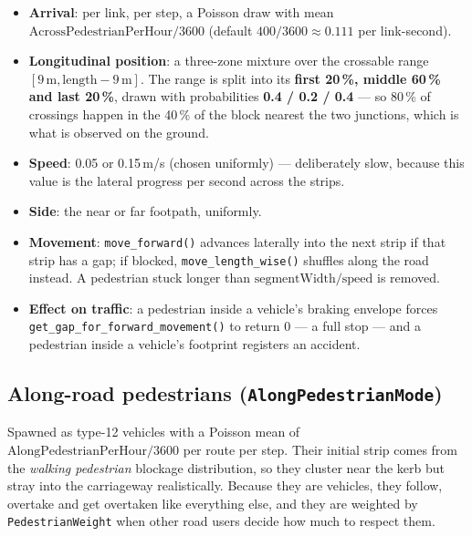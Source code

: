 \documentclass[11pt, a4paper]{article}
\newcommand{\code}[1]{\texttt{#1}}
\begin{document}
\begin{itemize}
    \item \textbf{Arrival}: per link, per step, a Poisson draw with mean
          $\text{AcrossPedestrianPerHour}/3600$ (default
          $400/3600 \approx 0.111$ per link-second).
    \item \textbf{Longitudinal position}: a three-zone mixture over the crossable
          range $[9\,\text{m}, \text{length}-9\,\text{m}]$. The range is split
          into its \textbf{first 20\,\%, middle 60\,\% and last 20\,\%}, drawn
          with probabilities \textbf{0.4 / 0.2 / 0.4} --- so 80\,\% of crossings
          happen in the 40\,\% of the block nearest the two junctions, which is
          what is observed on the ground.
    \item \textbf{Speed}: 0.05 or 0.15\,m/s (chosen uniformly) --- deliberately
          slow, because this value is the lateral progress per second across the
          strips.
    \item \textbf{Side}: the near or far footpath, uniformly.
    \item \textbf{Movement}: \code{move\_forward()} advances laterally into the
          next strip if that strip has a gap; if blocked,
          \code{move\_length\_wise()} shuffles along the road instead. A
          pedestrian stuck longer than $\text{segmentWidth}/\text{speed}$ is
          removed.
    \item \textbf{Effect on traffic}: a pedestrian inside a vehicle's braking
          envelope forces \code{get\_gap\_for\_forward\_movement()} to return 0
          --- a full stop --- and a pedestrian inside a vehicle's footprint
          registers an accident.
\end{itemize}

\subsection{Along-road pedestrians (\code{AlongPedestrianMode})}

Spawned as type-12 vehicles with a Poisson mean of
$\text{AlongPedestrianPerHour}/3600$ per route per step. Their initial strip
comes from the \emph{walking pedestrian} blockage distribution, so they cluster
near the kerb but stray into the carriageway realistically. Because they are
vehicles, they follow, overtake and get overtaken like everything else, and they
are weighted by \code{PedestrianWeight} when other road users decide how much to
respect them.
\end{document}
